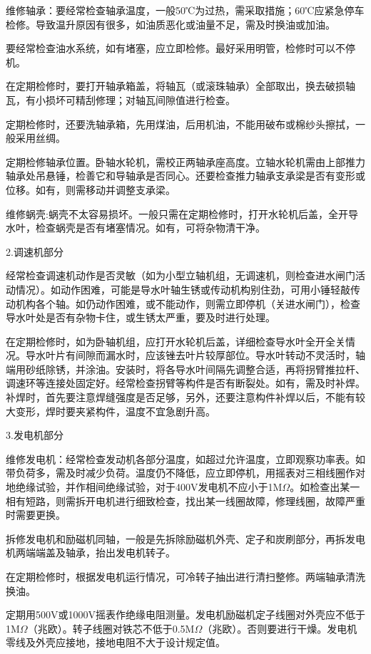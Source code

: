 \documentclass{ctexbook}
\begin{document}
维修轴承：要经常检查轴承温度，一般50℃为过热，需采取措施；60℃应紧急停车检修。导致温升原因有很多，如油质恶化或油量不足，需及时换油或加油。

要经常检查油水系统，如有堵塞，应立即检修。最好采用明管，检修时可以不停机。

在定期检修时，要打开轴承箱盖，将轴瓦（或滚珠轴承）全部取出，换去破损轴瓦，有小损坏可精刮修理；对轴瓦间隙值进行检查。

定期检修时，还要洗轴承箱，先用煤油，后用机油，不能用破布或棉纱头擦拭，一般采用丝绸。

定期检修轴承位置。卧轴水轮机，需校正两轴承座高度。立轴水轮机需由上部推力轴承处吊悬锤，检善它和导轴承是否同心。还要检查推力轴承支承梁是否有变形或位移。如有，则需移动并调整支承梁。

维修蜗壳:蜗壳不太容易损坏。一般只需在定期检修时，打开水轮机后盖，全开导水叶，检查蜗壳是否有堵塞情况。如有，可将杂物清干净。

2.调速机部分

经常检查调速机动作是否灵敏（如为小型立轴机组，无调速机，则检查进水闸门活动情况）。如动作困难，可能是导水叶轴生锈或传动机构别住劲，可用小锤轻敲传动机构各个轴。如仍动作困难，或不能动作，则需立即停机（关进水闸门），检查导水叶处是否有杂物卡住，或生锈太严重，要及时进行处理。

在定期检修时，如为卧轴机组，应打开水轮机后盖，详细检查导水叶全开全关情况。导水叶片有间隙而漏水时，应该锉去叶片较厚部位。导水叶转动不灵活时，轴端用砂纸除锈，并涂油。安装时，将各导水叶间隔先调整合适，再将拐臂推拉杆、调速环等连接处固定好。经常检查拐臂等构件是否有断裂处。如有，需及时补焊。补焊时，首先要注意焊缝强度是否足够，另外，还要注意构件补焊以后，不能有较大变形，焊时要夹紧构件，温度不宜急剧升高。

3.发电机部分

维修发电机：经常检查发动机各部分温度，如超过允许温度，立即观察功率表。如带负荷多，需及时减少负荷。温度仍不降低，应立即停机，用摇表对三相线圈作对地绝缘试验，并作相间绝缘试验，对于400V发电机不应小于1M$\Omega$。如检查出某一相有短路，则需拆开电机进行细致检查，找出某一线圈故障，修理线圈，故障严重时需要更换。

拆修发电机和励磁机同轴，一般是先拆除励磁机外壳、定子和炭刷部分，再拆发电机两端端盖及轴承，抬出发电机转子。

在定期检修时，根据发电机运行情况，可冷转子抽出进行清扫整修。两端轴承清洗换油。

定期用500V或1000V摇表作绝缘电阻测量。发电机励磁机定子线圈对外壳应不低于1M$\Omega$（兆欧）。转子线圈对铁芯不低于0.5M$\Omega$（兆欧）。否则要进行干燥。发电机零线及外壳应接地，接地电阻不大于设计规定值。
\end{document}
